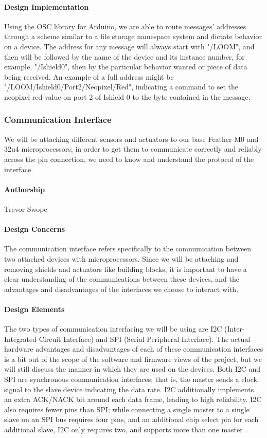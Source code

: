 \documentclass[onecolumn, draftclsnofoot,10pt, compsoc]{IEEEtran}
\begin{document}
\paragraph{Design Implementation}
    Using the OSC library for Arduino, we are able to route messages' addresses through a scheme similar to a file storage namespace system and dictate behavior on a device. The address for any message will always start with "/LOOM", and then will be followed by the name of the device and its instance number, for example, "/Ishield0", then by the particular behavior wanted or piece of data being received. An example of a full address might be "/LOOM/Ishield0/Port2/Neopixel/Red", indicating a command to set the neopixel red value on port 2 of Ishield 0 to the byte contained in the message. 


\subsubsection{Communication Interface}
    We will be attaching different sensors and actuators to our base Feather M0 and 32u4 microprocessors; in order to get them to communicate correctly and reliably across the pin connection, we need to know and understand the protocol of the interface. 

\paragraph{Authorship}
    Trevor Swope

\paragraph{Design Concerns}
    The communication interface refers specifically to the communication between two attached devices with microprocessors. Since we will be attaching and removing shields and actuators like building blocks, it is important to have a clear understanding of the communications between these devices, and the advantages and disadvantages of the interfaces we choose to interact with.

\paragraph{Design Elements}
    The two types of communication interfacing we will be using are I2C (Inter-Integrated Circuit Interface) and SPI (Serial Peripheral Interface).  The actual hardware advantages and disadvantages of each of these communication interfaces is a bit out of the scope of the software and firmware views of the project, but we will still discuss the manner in which they are used on the devices. Both I2C and SPI are synchronous communication interfaces; that is, the master sends a clock signal to the slave device indicating the data rate. I2C additionally implements an extra ACK/NACK bit around each data frame, leading to high reliability. I2C also requires fewer pins than SPI; while connecting a single master to a single slave on an SPI bus requires four pins, and an additional chip select pin for each additional slave, I2C only requires two, and supports more than one master \cite{I2C} \cite{SPI}.
\end{document}
